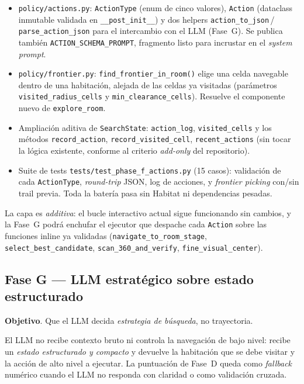 \documentclass[11pt,a4paper]{article}
\begin{document}
\begin{itemize}
  \item \texttt{policy/actions.py}: \texttt{ActionType} (enum de cinco
        valores), \texttt{Action} (dataclass inmutable validada en
        \texttt{\_\_post\_init\_\_}) y dos helpers
        \texttt{action\_to\_json}\,/\,\texttt{parse\_action\_json} para el
        intercambio con el LLM (Fase~G). Se publica también
        \texttt{ACTION\_SCHEMA\_PROMPT}, fragmento listo para incrustar en el
        \textit{system prompt}.
  \item \texttt{policy/frontier.py}: \texttt{find\_frontier\_in\_room()}
        elige una celda navegable dentro de una habitación, alejada de las
        celdas ya visitadas (parámetros \texttt{visited\_radius\_cells} y
        \texttt{min\_clearance\_cells}). Resuelve el componente nuevo de
        \texttt{explore\_room}.
  \item Ampliación aditiva de \texttt{SearchState}:
        \texttt{action\_log}, \texttt{visited\_cells} y los métodos
        \texttt{record\_action}, \texttt{record\_visited\_cell},
        \texttt{recent\_actions} (sin tocar la lógica existente, conforme al
        criterio \textit{add-only} del repositorio).
  \item Suite de tests \texttt{tests/test\_phase\_f\_actions.py} (15
        casos): validación de cada \texttt{ActionType}, \textit{round-trip}
        JSON, log de acciones, y \textit{frontier picking} con/sin trail
        previa. Toda la batería pasa sin Habitat ni dependencias pesadas.
\end{itemize}

La capa es \emph{additiva}: el bucle interactivo actual sigue funcionando
sin cambios, y la Fase~G podrá enchufar el ejecutor que despache cada
\texttt{Action} sobre las funciones inline ya validadas
(\texttt{navigate\_to\_room\_stage}, \texttt{select\_best\_candidate},
\texttt{scan\_360\_and\_verify}, \texttt{fine\_visual\_center}).

\subsection{Fase G --- LLM estratégico sobre estado estructurado}

\textbf{Objetivo}. Que el LLM decida \emph{estrategia de búsqueda}, no
trayectoria.

El LLM no recibe contexto bruto ni controla la navegación de bajo nivel:
recibe un \emph{estado estructurado y compacto} y devuelve la habitación que
se debe visitar y la acción de alto nivel a ejecutar. La puntuación de
Fase~D queda como \textit{fallback} numérico cuando el LLM no responda con
claridad o como validación cruzada.
\end{document}

